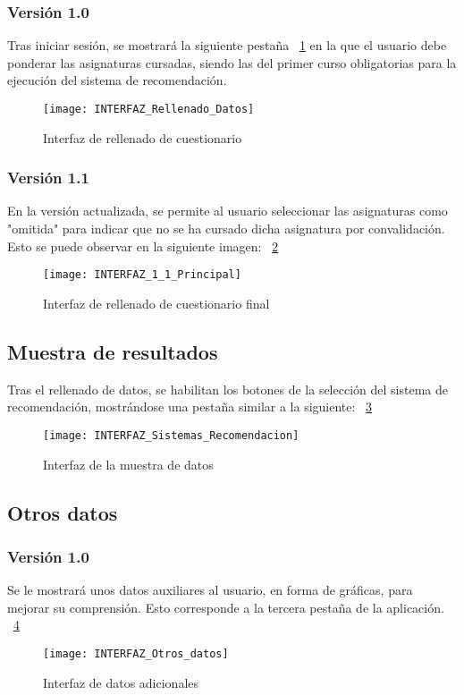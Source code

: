 \subsubsection{Versión 1.0}
Tras iniciar sesión, se mostrará la siguiente pestaña ~\ref{fig:C.3.2} en la que el usuario debe ponderar las asignaturas cursadas, siendo las del primer curso obligatorias para la ejecución del sistema de recomendación. 
\begin{figure}[h]
\centering
\texttt{[image: INTERFAZ\_Rellenado\_Datos]}
\caption{Interfaz de rellenado de cuestionario}
\label{fig:C.3.2}
\end{figure}

\subsubsection{Versión 1.1}
En la versión actualizada, se permite al usuario seleccionar las asignaturas como "omitida" para indicar que no se ha cursado dicha asignatura por convalidación. Esto se puede observar en la siguiente imagen: ~\ref{fig:C.3.3.1}
\begin{figure}[h]
\centering
\texttt{[image: INTERFAZ\_1\_1\_Principal]}
\caption{Interfaz de rellenado de cuestionario final}
\label{fig:C.3.3.1}
\end{figure}

\subsection{Muestra de resultados}
Tras el rellenado de datos, se habilitan los botones de la selección del sistema de recomendación, mostrándose una pestaña similar a la siguiente: ~\ref{fig:C.3.3}
\begin{figure}[h]
\centering
\texttt{[image: INTERFAZ\_Sistemas\_Recomendacion]}
\caption{Interfaz de la muestra de datos}
\label{fig:C.3.3}
\end{figure}

\subsection{Otros datos}
\subsubsection{Versión 1.0}
Se le mostrará unos datos auxiliares al usuario, en forma de gráficas, para mejorar su comprensión. Esto corresponde a la tercera pestaña de la aplicación. ~\ref{fig:C.3.4}
\begin{figure}[h]
\centering
\texttt{[image: INTERFAZ\_Otros\_datos]}
\caption{Interfaz de datos adicionales}
\label{fig:C.3.4}
\end{figure}
